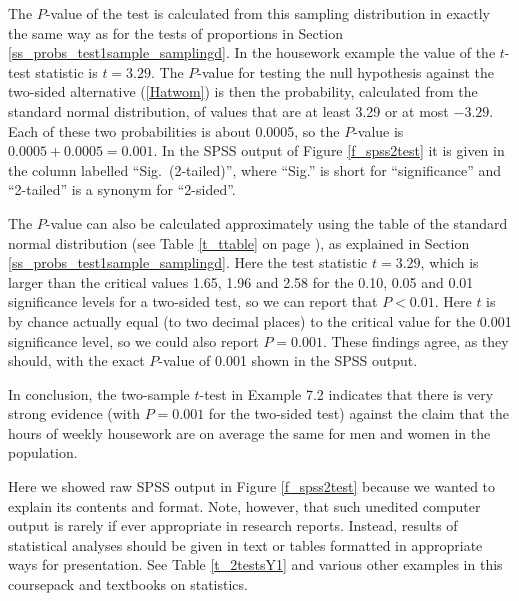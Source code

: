 The $P$-value of the test is calculated from this sampling distribution
in exactly the same way as for the tests of proportions in Section
\ref{ss_probs_test1sample_samplingd}. In the housework example the value
of the $t$-test statistic is $t=3.29$. The $P$-value for testing the
null hypothesis against the two-sided alternative
(\ref{Hatwom}) is then the probability, calculated from the standard
normal distribution, of values that are at least 3.29 or at most
$-3.29$. Each of these two probabilities is about 0.0005, so the
$P$-value is $0.0005+0.0005=0.001$. In the SPSS output of Figure
\ref{f_spss2test} it is given in the
column labelled ``Sig.\ (2-tailed)'', where ``Sig.'' is short for
``significance'' and ``2-tailed'' is a synonym for ``2-sided''.

The $P$-value can also be calculated approximately using the table of
the standard normal distribution (see Table \ref{t_ttable} on page
\pageref{t_ttable}), as explained in Section
\ref{ss_probs_test1sample_samplingd}. Here the test statistic $t=3.29$,
which is larger than the critical values 1.65, 1.96 and 2.58 for the
0.10, 0.05 and 0.01 significance levels for a two-sided test, so we can
report that $P<0.01$. Here $t$ is by chance actually equal (to two
decimal places) to the critical value for the 0.001 significance level,
so we could also report $P=0.001$. These findings agree, as they should,
with the exact $P$-value of 0.001 shown in the SPSS output.

In conclusion, the two-sample $t$-test in Example 7.2 indicates that there
is very strong evidence (with $P=0.001$ for the two-sided test) against
the claim that the hours of weekly housework are on average the
same for men and women in the population.

Here we showed raw SPSS output in Figure \ref{f_spss2test} because we
wanted to explain its contents
and format. Note, however, that such unedited computer output is
rarely if ever appropriate in research reports.
Instead, results of statistical analyses should be given in text or
tables formatted in appropriate ways for presentation. See Table
\ref{t_2testsY1} and various other examples in this coursepack and
textbooks on statistics.


